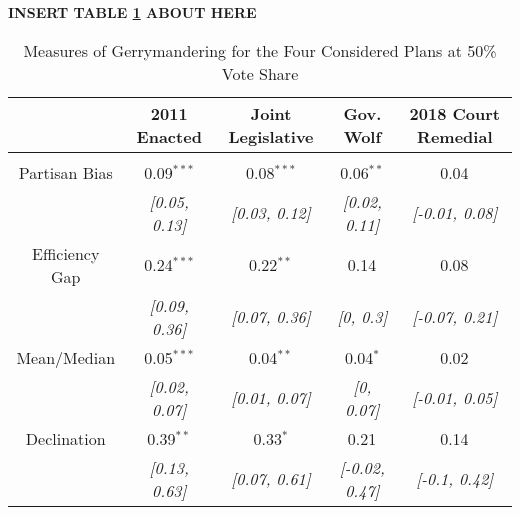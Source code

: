 


 \begin{center}\textbf{INSERT TABLE \ref{tab:gerry} ABOUT HERE} \end{center}


\begin{table}[!htbp] \centering 
  \caption{Measures of Gerrymandering for the Four Considered Plans at 50\% Vote Share} 
  \label{tab:gerry} 
\begin{tabular}{@{\extracolsep{-5pt}} ccccc} 
 & 2011 Enacted & Joint Legislative & Gov. Wolf & 2018 Court Remedial \\ 
\hline \\[-1.8ex] 
Partisan Bias & 0.09$^{***}$ & 0.08$^{***}$ & 0.06$^{**}$ & 0.04$^{}$ \\ 
 & {\small\textit{[0.05, 0.13]}} & {\small\textit{[0.03, 0.12]}} & {\small\textit{[0.02, 0.11]}} & {\small\textit{[-0.01, 0.08]}} \\ 
Efficiency Gap & 0.24$^{***}$ & 0.22$^{**}$ & 0.14$^{}$ & 0.08$^{}$ \\ 
 & {\small\textit{[0.09, 0.36]}} & {\small\textit{[0.07, 0.36]}} & {\small\textit{[0, 0.3]}} & {\small\textit{[-0.07, 0.21]}} \\ 
Mean/Median & 0.05$^{***}$ & 0.04$^{**}$ & 0.04$^{*}$ & 0.02$^{}$ \\ 
 & {\small\textit{[0.02, 0.07]}} & {\small\textit{[0.01, 0.07]}} & {\small\textit{[0, 0.07]}} & {\small\textit{[-0.01, 0.05]}} \\ 
Declination & 0.39$^{**}$ & 0.33$^{*}$ & 0.21$^{}$ & 0.14$^{}$ \\ 
 & {\small\textit{[0.13, 0.63]}} & {\small\textit{[0.07, 0.61]}} & {\small\textit{[-0.02, 0.47]}} & {\small\textit{[-0.1, 0.42]}} \\ 
\end{tabular}
\end{table}
 
 
